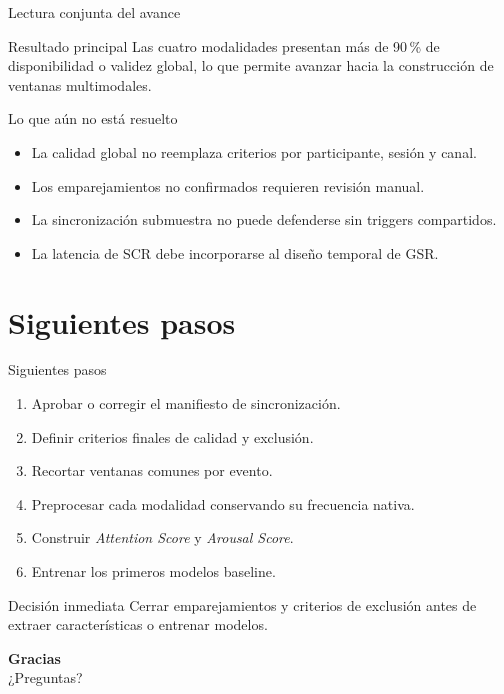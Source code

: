 \documentclass[aspectratio=169]{beamer}
\begin{document}
\begin{frame}{Lectura conjunta del avance}
\begin{block}{Resultado principal}
Las cuatro modalidades presentan más de 90\,\% de disponibilidad o validez global, lo que
permite avanzar hacia la construcción de ventanas multimodales.
\end{block}

\begin{alertblock}{Lo que aún no está resuelto}
\begin{itemize}
  \item La calidad global no reemplaza criterios por participante, sesión y canal.
  \item Los emparejamientos no confirmados requieren revisión manual.
  \item La sincronización submuestra no puede defenderse sin triggers compartidos.
  \item La latencia de SCR debe incorporarse al diseño temporal de GSR.
\end{itemize}
\end{alertblock}
\end{frame}

\section{Siguientes pasos}
\begin{frame}{Siguientes pasos}
\begin{enumerate}
  \item Aprobar o corregir el manifiesto de sincronización.
  \item Definir criterios finales de calidad y exclusión.
  \item Recortar ventanas comunes por evento.
  \item Preprocesar cada modalidad conservando su frecuencia nativa.
  \item Construir \textit{Attention Score} y \textit{Arousal Score}.
  \item Entrenar los primeros modelos baseline.
\end{enumerate}

\begin{block}{Decisión inmediata}
Cerrar emparejamientos y criterios de exclusión antes de extraer características o entrenar modelos.
\end{block}
\end{frame}

\begin{frame}{}
\centering
\vspace{1cm}
{\Large \textbf{Gracias}}\\[1em]
¿Preguntas?
\end{frame}
\end{document}
